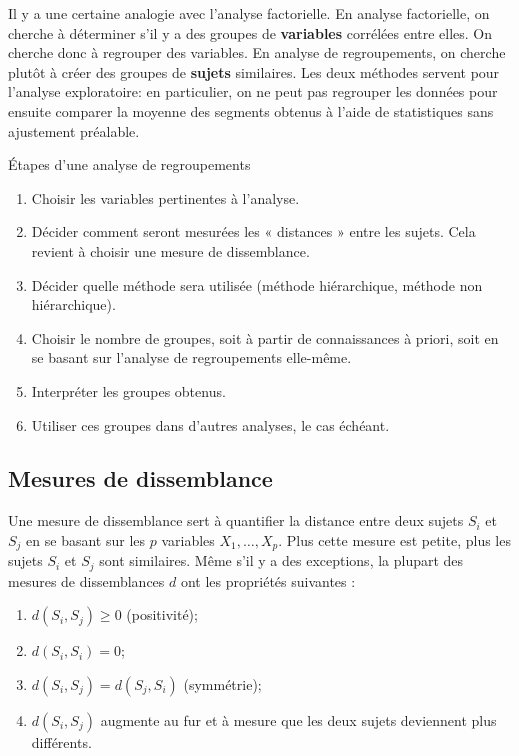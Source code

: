 \documentclass[
  11pt,
  letterpaper,
]{book}
\providecommand{\tightlist}{%
  \setlength{\itemsep}{0pt}\setlength{\parskip}{0pt}}
\theoremstyle{definition}
\theoremstyle{definition}
\theoremstyle{definition}
\theoremstyle{remark}
\begin{document}
Il y a une certaine analogie avec l'analyse factorielle. En analyse factorielle, on cherche à déterminer s'il y a des groupes de \textbf{variables} corrélées entre elles. On cherche donc à regrouper des variables. En analyse de regroupements, on cherche plutôt à créer des groupes de \textbf{sujets} similaires. Les deux méthodes servent pour l'analyse exploratoire: en particulier, on ne peut pas regrouper les données pour ensuite comparer la moyenne des segments obtenus à l'aide de statistiques sans ajustement préalable.

Étapes d'une analyse de regroupements

\begin{enumerate}
\def\labelenumi{\arabic{enumi})}
\tightlist
\item
  Choisir les variables pertinentes à l'analyse.
\item
  Décider comment seront mesurées les « distances » entre les sujets. Cela revient à choisir une mesure de dissemblance.
\item
  Décider quelle méthode sera utilisée (méthode hiérarchique, méthode non hiérarchique).
\item
  Choisir le nombre de groupes, soit à partir de connaissances à priori, soit en se basant sur l'analyse de regroupements elle-même.
\item
  Interpréter les groupes obtenus.
\item
  Utiliser ces groupes dans d'autres analyses, le cas échéant.
\end{enumerate}

\hypertarget{mesures-de-dissemblance}{%
\subsection{Mesures de dissemblance}\label{mesures-de-dissemblance}}

Une mesure de dissemblance sert à quantifier la distance entre deux sujets \(S_i\) et \(S_j\) en se basant sur les \(p\) variables \(X_1, \ldots, X_p\). Plus cette mesure est petite, plus les sujets \(S_i\) et \(S_j\) sont similaires. Même s'il y a des exceptions, la plupart des mesures de dissemblances \(d\) ont les propriétés suivantes :

\begin{enumerate}
\def\labelenumi{\arabic{enumi})}
\tightlist
\item
  \(d(S_i, S_j) \geq 0\) (positivité);
\item
  \(d(S_i, S_i)=0\);
\item
  \(d(S_i, S_j)=d(S_j, S_i)\) (symmétrie);
\item
  \(d(S_i, S_j)\) augmente au fur et à mesure que les deux sujets deviennent plus différents.
\end{enumerate}
\end{document}
